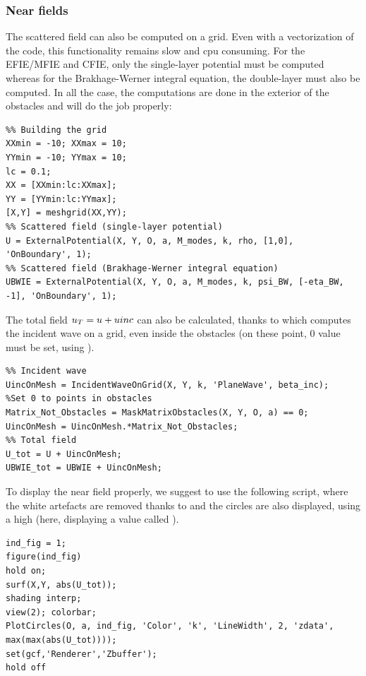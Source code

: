 \subsubsection{Near fields}

The scattered field can also be computed on a grid. Even with a vectorization of the code, this functionality remains slow and cpu consuming. For the EFIE/MFIE and CFIE, only the single-layer potential must be computed whereas for the Brakhage-Werner integral equation, the double-layer must also be computed. In all the case, the computations are done in the exterior of the obstacles and \ExternalPotential will do the job properly:

\begin{lstlisting}
%% Building the grid
XXmin = -10; XXmax = 10;
YYmin = -10; YYmax = 10;
lc = 0.1;
XX = [XXmin:lc:XXmax];
YY = [YYmin:lc:YYmax];
[X,Y] = meshgrid(XX,YY);
%% Scattered field (single-layer potential)
U = ExternalPotential(X, Y, O, a, M_modes, k, rho, [1,0], 'OnBoundary', 1);
%% Scattered field (Brakhage-Werner integral equation)
UBWIE = ExternalPotential(X, Y, O, a, M_modes, k, psi_BW, [-eta_BW, -1], 'OnBoundary', 1);
\end{lstlisting}

The total field $u_T = u + uinc$ can also be calculated, thanks to \IncidentWaveOnGrid which computes the incident wave on a grid, even inside the obstacles (on these point, $0$ value must be set, using \MaskMatrixObstacles).

\begin{lstlisting}
%% Incident wave
UincOnMesh = IncidentWaveOnGrid(X, Y, k, 'PlaneWave', beta_inc);
%Set 0 to points in obstacles
Matrix_Not_Obstacles = MaskMatrixObstacles(X, Y, O, a) == 0;
UincOnMesh = UincOnMesh.*Matrix_Not_Obstacles;
%% Total field
U_tot = U + UincOnMesh;
UBWIE_tot = UBWIE + UincOnMesh;
\end{lstlisting}

\begin{remark}\label{rem:plotNearField}
To display the near field properly, we suggest to use the following script, where the white artefacts are removed thanks to  and the circles are also displayed, using a high  (here, displaying a value called ).

\begin{lstlisting}
ind_fig = 1;
figure(ind_fig)
hold on;
surf(X,Y, abs(U_tot));
shading interp;
view(2); colorbar;
PlotCircles(O, a, ind_fig, 'Color', 'k', 'LineWidth', 2, 'zdata', max(max(abs(U_tot))));
set(gcf,'Renderer','Zbuffer');
hold off
\end{lstlisting}
\end{remark}
